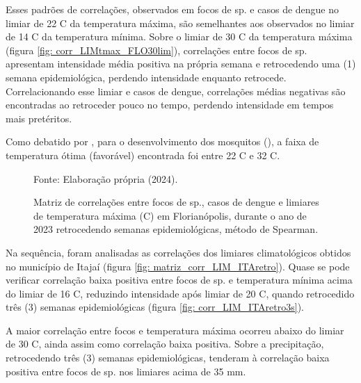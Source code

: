 \indent Esses padrões de correlações, observados em focos de  sp. e casos de dengue no limiar de 22 C da temperatura máxima, são semelhantes aos observados no limiar de 14 C da temperatura mínima. Sobre o limiar de 30 C da temperatura máxima (figura \ref{fig: corr_LIMtmax_FLO30lim}), correlações entre focos de  sp. apresentam intensidade média positiva na própria semana e retrocedendo uma (1) semana epidemiológica, perdendo intensidade enquanto retrocede. Correlacionando esse limiar e casos de dengue, correlações médias negativas são encontradas ao retroceder pouco no tempo, perdendo intensidade em tempos mais pretéritos.

\indent Como debatido por , para o desenvolvimento dos mosquitos (), a faixa de temperatura ótima (favorável) encontrada foi entre 22 C e 32 C.


\begin{figure}[htbp]
    \begin{center}
    \caption{Matriz de correlações entre focos de  sp., casos de dengue e limiares de temperatura máxima (C) em Florianópolis, durante o ano de 2023 retrocedendo semanas epidemiológicas, método de Spearman.}
    \label{fig: matriz_corr_LIMtmax_FLO}
        \hfill
    \end{center}
    \small{Fonte: Elaboração própria (2024).}
\end{figure}


Na sequência, foram analisadas as correlações dos limiares climatológicos obtidos no município de Itajaí (figura \ref{fig: matriz_corr_LIM_ITAretro}). Quase se pode verificar correlação baixa positiva entre focos de  sp. e temperatura mínima acima do limiar de 16 C, reduzindo intensidade após limiar de 20 C, quando retrocedido três (3) semanas epidemiológicas (figura \ref{fig: corr_LIM_ITAretro3s}).

\indent A maior correlação entre focos e temperatura máxima ocorreu abaixo do limiar de 30 C, ainda assim como correlação baixa positiva. Sobre a precipitação, retrocedendo três (3) semanas epidemiológicas, tenderam à correlação baixa positiva entre focos de  sp. nos limiares acima de 35 mm.

